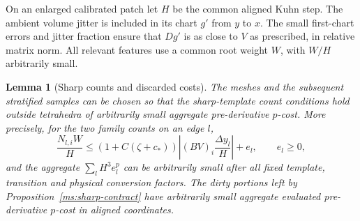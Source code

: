 \documentclass[11pt]{article}
\numberwithin{equation}{section}
\newtheorem{lemma}[theorem]{Lemma}
\theoremstyle{definition}
\theoremstyle{remark}
\begin{document}
On an enlarged calibrated patch let $H$ be the common aligned Kuhn
step.  The ambient volume jitter is included in its chart $g'$ from
$y$ to $x$.  The small first-chart errors and jitter fraction ensure
that $Dg'$ is as close to $V$ as prescribed, in relative matrix norm.
All relevant features use a common root weight $W$, with $W/H$
arbitrarily small.

\begin{lemma}[Sharp counts and discarded costs]\label{ha:sharp-counts}
The meshes and the subsequent stratified samples can be chosen so
that the sharp-template count conditions hold outside tetrahedra
of arbitrarily small aggregate pre-derivative $p$-cost.  More
precisely, for the two family counts on an edge $l$,
\begin{equation}\label{ha:sharp-edge}
 \frac{N_{l,i}W}{H}
 \le (1+C(\zeta+c_*))
          \left|(BV)_i\frac{\Delta y_l}{H}\right|+e_l,
 \qquad e_l\ge0,
\end{equation}
and the aggregate $\sum_lH^3e_l^p$ can be arbitrarily small after all
fixed template, transition and physical conversion factors.
The dirty portions left by Proposition~\ref{ms:sharp-contract} have
arbitrarily small aggregate evaluated pre-derivative $p$-cost in
aligned coordinates.
\end{lemma}
\end{document}
